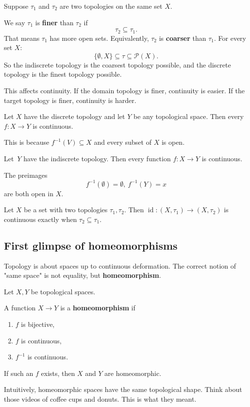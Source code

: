 \documentclass[11pt]{article}
\begin{document}
Suppose $\tau_1$ and $\tau_2$ are two topologies on 
the same set $X$. 

We say $\tau_1$ is \textbf{finer} than $\tau_2$ if 
\[
    \tau_2 \subseteq \tau_1. 
\]
That means $\tau_1$ has more open sets. 
Equivalently, $\tau_2$ is \textbf{coarser} than 
$\tau_1$. For every set $X$: 
\[
    \{\emptyset, X\} \subseteq \tau \subseteq \mathcal P(X). 
\]
So the indiscrete topology is the coarsest topology possible, 
and the discrete topology is the finest topology possible. 

This affects continuity. If the domain topology is finer, 
continuity is easier. If the target topology is finer, continuity 
is harder. 

\begin{ex}
    Let $X$ have the discrete topology and let $Y$ be any 
    topological space. 
    Then every $f : X \to Y$ is continuous. 

    This is because $f^{-1}(V) \subseteq X$ and 
    every subset of $X$ is open. 
\end{ex}
\begin{ex}
    Let $Y$ have the indiscrete topology. Then 
    every function $f :X \to Y$ is continuous. 
    
    The preimages 
    \[
        f^{-1}(\emptyset) = \emptyset, \ 
        f^{-1}(Y) = x
    \]
    are both open in $X$. 
\end{ex}
\begin{ex}
    Let $X$ be a set with two topologies $\tau_1, \tau_2$. 
    Then $\operatorname{id} : (X, \tau_1) \to (X,\tau_2)$ is 
    continuous exactly when $\tau_2 \subseteq \tau_1$. 
\end{ex}

\subsection*{First glimpse of homeomorphisms}

Topology is about spaces up to continuous deformation. 
The correct notion of "same space" is not equality, but 
\textbf{homeomorphism}. 

\begin{defn}[Homeomorphism] 
    Let $X,Y$ be topological spaces. 

    A function $X \to Y$ is a \textbf{homeomorphism} if 
    \begin{enumerate}
        \item $f$ is bijective, 
        \item $f$ is continuous, 
        \item $f^{-1}$ is continuous.
    \end{enumerate}
    If such an $f$ exists, then $X$ and $Y$ are homeomorphic. 
\end{defn}
Intuitively, homeomorphic spaces have the same topological shape. 
Think about those videos of coffee cups and donuts. This is what 
they meant. 
\end{document}
